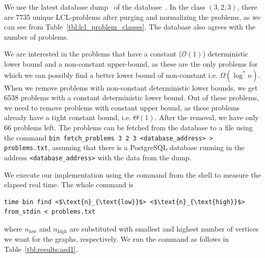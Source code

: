 We use the latest database dump~\cite{DatabaseDump} of the database~\cite{Tereshchenko2021,LclClassifierAalto,LclClassifierGithub}.
In the class $(3,2,3)$, there are 7735 unique LCL-problems after purging and normalizing the problems, as we can see from Table~\ref{tbl:lcl_problem_classes}.
The database also agrees with the number of problems.

We are interested in the problems that have a constant ($\mathcal{O}(1)$) deterministic lower bound and a non-constant upper-bound, as these are the only problems for which we can possibly find a better lower bound of non-constant i.e. $\Omega(\log^*n)$.
When we remove problems with non-constant deterministic lower bounds, we get 6538 problems with a constant deterministic lower bound.
Out of these problems, we need to remove problems with constant upper bound, as these problems already have a tight constant bound, i.e. $\Theta(1)$.
After the removal, we have only 66 problems left.
The problems can be fetched from the database to a file  using the command \verb|bin fetch_problems 3 2 3 <database_address> > problems.txt|, assuming that there is a PostgreSQL database running in the address \verb|<database_address>| with the data from the dump.


\lstset{
  basicstyle=\ttfamily,
  mathescape,
  columns=fixed,
  fontadjust=true,
  basewidth=0.5em
}

We execute our implementation using the command  from the shell  to measure the elapsed real time.
The whole command is
\begin{lstlisting}
time bin find <$\text{n}_{\text{low}}$> <$\text{n}_{\text{high}}$> from_stdin < problems.txt
\end{lstlisting}
where $n_\text{low}$ and $n_\text{high}$ are substituted with smallest and highest number of vertices we want for the graphs, respectively.
We run the command as follows in Table~\ref{tbl:results:asd1}.

